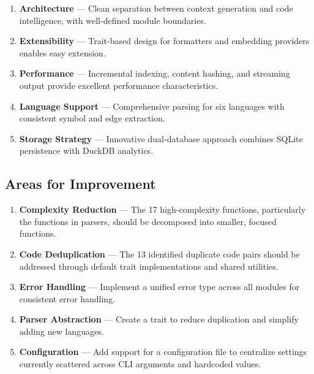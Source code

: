 \begin{enumerate}
    \item \textbf{Architecture} --- Clean separation between context generation and code intelligence, with well-defined module boundaries.
    
    \item \textbf{Extensibility} --- Trait-based design for formatters and embedding providers enables easy extension.
    
    \item \textbf{Performance} --- Incremental indexing, content hashing, and streaming output provide excellent performance characteristics.
    
    \item \textbf{Language Support} --- Comprehensive parsing for six languages with consistent symbol and edge extraction.
    
    \item \textbf{Storage Strategy} --- Innovative dual-database approach combines SQLite persistence with DuckDB analytics.
\end{enumerate}

\subsection{Areas for Improvement}

\begin{enumerate}
    \item \textbf{Complexity Reduction} --- The 17 high-complexity functions, particularly the  functions in parsers, should be decomposed into smaller, focused functions.
    
    \item \textbf{Code Deduplication} --- The 13 identified duplicate code pairs should be addressed through default trait implementations and shared utilities.
    
    \item \textbf{Error Handling} --- Implement a unified error type across all modules for consistent error handling.
    
    \item \textbf{Parser Abstraction} --- Create a  trait to reduce duplication and simplify adding new languages.
    
    \item \textbf{Configuration} --- Add support for a configuration file to centralize settings currently scattered across CLI arguments and hardcoded values.
\end{enumerate}

